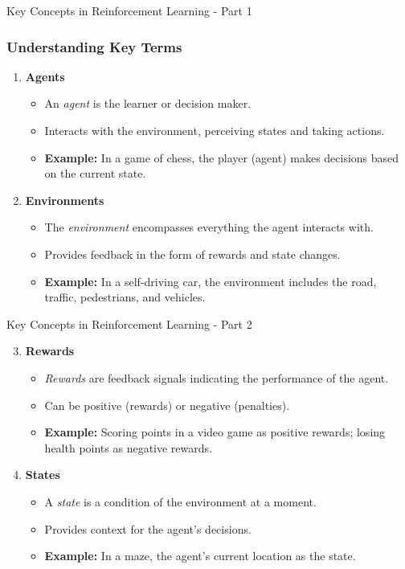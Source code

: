 \documentclass[aspectratio=169]{beamer}
\begin{document}
\begin{frame}[fragile]{Key Concepts in Reinforcement Learning - Part 1}
    \frametitle{Understanding Key Terms}
    \begin{enumerate}
        \item \textbf{Agents}
        \begin{itemize}
            \item An \emph{agent} is the learner or decision maker.
            \item Interacts with the environment, perceiving states and taking actions.
            \item \textbf{Example:} In a game of chess, the player (agent) makes decisions based on the current state.
        \end{itemize}
        
        \item \textbf{Environments}
        \begin{itemize}
            \item The \emph{environment} encompasses everything the agent interacts with.
            \item Provides feedback in the form of rewards and state changes.
            \item \textbf{Example:} In a self-driving car, the environment includes the road, traffic, pedestrians, and vehicles.
        \end{itemize}
    \end{enumerate}
\end{frame}

\begin{frame}[fragile]{Key Concepts in Reinforcement Learning - Part 2}
    \begin{enumerate}
        \setcounter{enumi}{2}
        \item \textbf{Rewards}
        \begin{itemize}
            \item \emph{Rewards} are feedback signals indicating the performance of the agent.
            \item Can be positive (rewards) or negative (penalties).
            \item \textbf{Example:} Scoring points in a video game as positive rewards; losing health points as negative rewards.
        \end{itemize}
        
        \item \textbf{States}
        \begin{itemize}
            \item A \emph{state} is a condition of the environment at a moment.
            \item Provides context for the agent's decisions.
            \item \textbf{Example:} In a maze, the agent's current location as the state.
        \end{itemize}
    \end{enumerate}
\end{frame}
\end{document}
